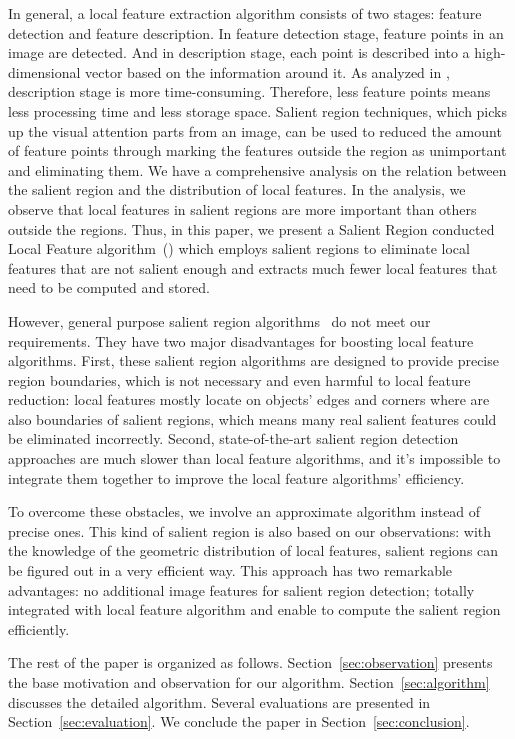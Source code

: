 In general, a local feature extraction algorithm consists of two stages: feature detection and feature description. In feature detection stage, feature points in an image are detected. And in description stage, each point is described into a high-dimensional vector based on the information around it. As analyzed in \cite{adaptivepipelineicpp2012}, description stage is more time-consuming. Therefore, less feature points means less processing time and less storage space. Salient region techniques, which picks up the visual attention parts from an image, can be used to reduced the amount of feature points through marking the features outside the region as unimportant and eliminating them. We have a comprehensive analysis on the relation between the salient region and the distribution of local features. In the analysis, we observe that local features in salient regions are more important than others outside the regions. Thus, in this paper, we present a Salient Region conducted Local Feature algorithm~({\sys}) which employs salient regions to eliminate local features that are not salient enough and extracts much fewer local features that need to be computed and stored.

However, general purpose salient region algorithms~\cite{cheng2011global,achanta2009frequency,itti1998model} do not meet our requirements. They have two major disadvantages for boosting local feature algorithms. First, these salient region algorithms are designed to provide precise region boundaries, which is not necessary and even harmful to local feature reduction: local features mostly locate on objects' edges and corners where are also boundaries of salient regions, which means many real salient features could be eliminated incorrectly. Second, state-of-the-art salient region detection approaches are much slower than local feature algorithms, and it's impossible to integrate them together to improve the local feature algorithms' efficiency.

To overcome these obstacles, we involve an approximate algorithm instead of precise ones. This kind of salient region is also based on our observations: with the knowledge of the geometric distribution of local features, salient regions can be figured out in a very efficient way. This approach has two remarkable advantages: no additional image features for salient region detection; totally integrated with local feature algorithm and enable to compute the salient region efficiently.

The rest of the paper is organized as follows. Section~\ref{sec:observation} presents the base motivation and observation for our algorithm. Section~\ref{sec:algorithm} discusses the detailed algorithm. Several evaluations are presented in Section~\ref{sec:evaluation}. We conclude the paper in Section~\ref{sec:conclusion}.